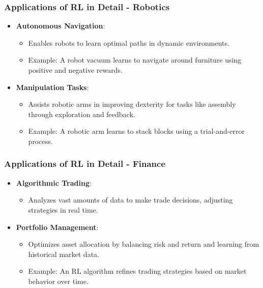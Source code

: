 \documentclass[aspectratio=169]{beamer}
\begin{document}
\begin{frame}[fragile]
    \frametitle{Applications of RL in Detail - Robotics}
    
    \begin{itemize}
        \item \textbf{Autonomous Navigation}:
            \begin{itemize}
                \item Enables robots to learn optimal paths in dynamic environments.
                \item Example: A robot vacuum learns to navigate around furniture using positive and negative rewards.
            \end{itemize}
        \item \textbf{Manipulation Tasks}:
            \begin{itemize}
                \item Assists robotic arms in improving dexterity for tasks like assembly through exploration and feedback.
                \item Example: A robotic arm learns to stack blocks using a trial-and-error process.
            \end{itemize}
    \end{itemize}
\end{frame}

\begin{frame}[fragile]
    \frametitle{Applications of RL in Detail - Finance}
    
    \begin{itemize}
        \item \textbf{Algorithmic Trading}:
            \begin{itemize}
                \item Analyzes vast amounts of data to make trade decisions, adjusting strategies in real time.
            \end{itemize}
        \item \textbf{Portfolio Management}:
            \begin{itemize}
                \item Optimizes asset allocation by balancing risk and return and learning from historical market data.
                \item Example: An RL algorithm refines trading strategies based on market behavior over time.
            \end{itemize}
    \end{itemize}
\end{frame}
\end{document}
